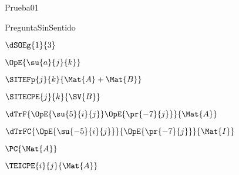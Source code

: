\documentclass[10pt]{article}
\begin{document}
\begin{quiz}{Prueba01}
\begin{multi}{PreguntaSinSentido}
    \item $\dSOEg{1}{3}$
    \item $\OpE{\su{a}{j}{k}}$
    \item $\SITEFp{j}{k}{\Mat{A}+\Mat{B}}$
    \item $\SITECPE{j}{k}{\SV{B}}$
    \item $\dTrF{\OpE{\su{5}{i}{j}}\OpE{\pr{-7}{j}}}{\Mat{A}}$
    \item $\dTrFC{\OpE{\su{-5}{i}{j}}}{\OpE{\pr{-7}{j}}}{\Mat{I}}$
    \item $\PC{\Mat{A}}$
    \item $\TEICPE{i}{j}{\Mat{A}}$
    \end{multi}
    
  \end{quiz}
  
\end{document}
